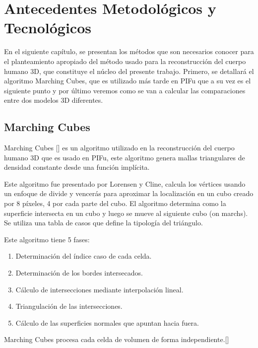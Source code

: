 
\chapter{Antecedentes Metodológicos y Tecnológicos}
\label{Antecedentes Metodológicos y Tecnológicos}
En el siguiente capítulo, se presentan los métodos que son necesarios
conocer para el planteamiento apropiado del método usado para la reconstrucción del cuerpo humano 3D, que constituye el núcleo del presente trabajo.
Primero, se detallará el algoritmo Marching Cubes, que es utilizado más tarde en PIFu que a su vez es el siguiente punto y por último veremos como se van a calcular las comparaciones entre dos modelos 3D diferentes. 

\section{Marching Cubes}
Marching Cubes [\cite{marchingcube}] es un algoritmo utilizado en la reconstrucción del cuerpo humano 3D que es usado en PIFu, este algoritmo genera mallas triangulares de densidad constante desde una función implícita. 

Este algoritmo fue presentado por Lorensen y Cline, calcula los vértices usando un enfoque de divide y vencerás para aproximar la localización en un cubo creado por 8 píxeles, 4 por cada parte del cubo. El algoritmo determina como la superficie intersecta en un cubo y luego se mueve al siguiente cubo (on marchs). Se utiliza una tabla de casos que define la tipología del triángulo.

Este algoritmo tiene 5 fases:
\begin{enumerate}
	\item Determinación del índice caso de cada celda.
	\item Determinación de los bordes intersecados.
	\item Cálculo de intersecciones mediante interpolación lineal.
	\item Triangulación de las intersecciones.
	\item Cálculo de las superficies normales que apuntan hacia fuera.
\end{enumerate}
Marching Cubes procesa cada celda de volumen de forma independiente.[\cite{marchingcubes2}]


